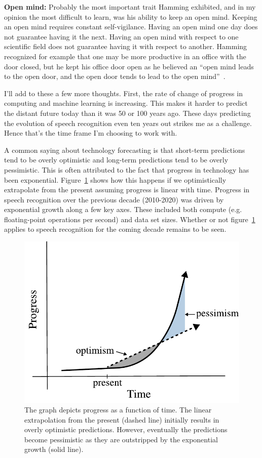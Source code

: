 {\bf Open mind:} Probably the most important trait Hamming exhibited, and in my
opinion the most difficult to learn, was his ability to keep an open mind.
Keeping an open mind requires constant self-vigilance. Having an open mind one
day does not guarantee having it the next. Having an open mind with respect to
one scientific field does not guarantee having it with respect to another.
Hamming recognized for example that one may be more productive in an office
with the door closed, but he kept his office door open as he believed an ``open
mind leads to the open door, and the open door tends to lead to the open
mind''~\citep[chp. 30]{hamming1997art}.

I'll add to these a few more thoughts. First, the rate of change of progress in
computing and machine learning is increasing. This makes it harder to predict
the distant future today than it was 50 or 100 years ago. These days predicting
the evolution of speech recognition even ten years out strikes me as a
challenge. Hence that's the time frame I'm choosing to work with.

A common saying about technology forecasting is that short-term predictions
tend to be overly optimistic and long-term predictions tend to be overly
pessimistic. This is often attributed to the fact that progress in technology
has been exponential. Figure~\ref{fig:exponential_growth} shows how this
happens if we optimistically extrapolate from the present assuming progress is
linear with time. Progress in speech recognition over the previous decade
(2010-2020) was driven by exponential growth along a few key axes. These
included both compute (e.g. floating-point operations per second) and data set
sizes. Whether or not figure~\ref{fig:exponential_growth} applies to speech
recognition for the coming decade remains to be seen.

\begin{figure}
    \centering
    \includegraphics[width=\linewidth]{figures/exponential_growth}
    \caption{The graph depicts progress as a function of time. The linear
    extrapolation from the present (dashed line) initially results in overly
    optimistic predictions.  However, eventually the predictions become
    pessimistic as they are outstripped by the exponential growth (solid
    line).}
    \label{fig:exponential_growth}
\end{figure}

